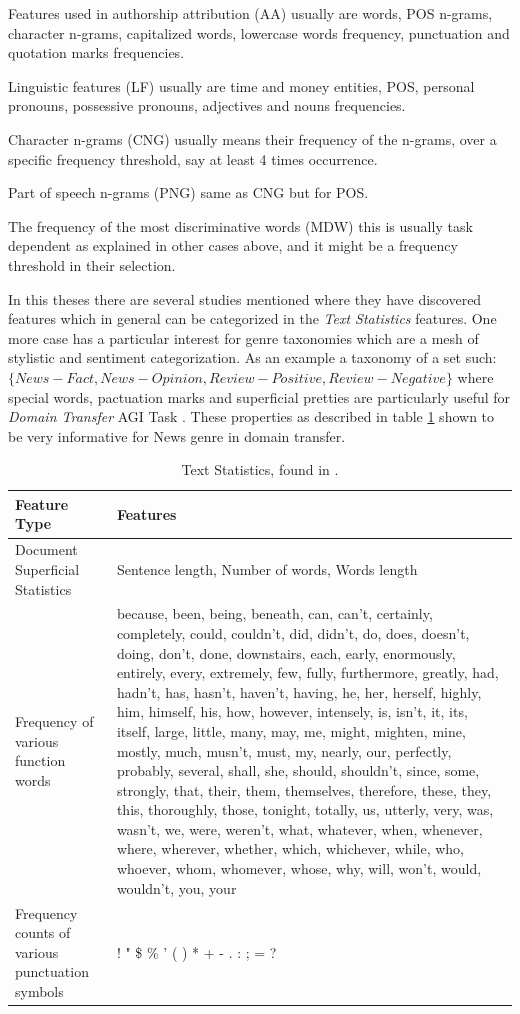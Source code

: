 Features used in authorship attribution (AA) usually are words, POS n-grams, character n-grams, capitalized words, lowercase words frequency, punctuation and quotation marks frequencies. 

Linguistic features (LF) usually are time and money entities, POS, personal pronouns, possessive pronouns, adjectives and nouns frequencies. 

Character n-grams (CNG) usually means their frequency of the n-grams, over a specific frequency threshold, say at least 4 times occurrence. 

Part of speech n-grams (PNG) same as CNG but for POS.

The frequency of the most discriminative words (MDW) this is usually task dependent as explained in other cases above, and it might be a frequency threshold in their selection. 

In this theses there are several studies mentioned where they have discovered features which in general can be categorized in the \textit{Text Statistics} features. One more case has a particular interest for genre taxonomies which are a mesh of stylistic and sentiment categorization. As an example a taxonomy of a set such: $\{News-Fact, News-Opinion, Review-Positive, Review-Negative\}$ where special words, pactuation marks and superficial pretties are particularly useful for \textit{Domain Transfer} AGI Task \parencite{finn2006learning}. These properties as described in table \ref{chap:relevant_work:tbl:domain_trans_text_statistics} shown to be very informative for News genre in domain transfer.

\begin{table}[t]
	\center
	\caption {Text Statistics, found in \parencite{finn2006learning}.}\label{chap:relevant_work:tbl:domain_trans_text_statistics}
	\begin{tabular}{p{3cm}|p{11cm}}
		\hline
		Feature Type & Features\\
		\hline
		 Document Superficial Statistics & Sentence length, Number of words, Words length \\
         Frequency of various function words & because, been, being, beneath, can, can’t, certainly, completely, could, couldn’t, did, didn’t, do, does, doesn’t, doing, don’t, done, downstairs, each, early, enormously, entirely, every, extremely, few, fully, furthermore, greatly, had, hadn’t, has, hasn’t, haven’t, having, he, her, herself, highly, him, himself, his, how, however, intensely, is, isn’t, it, its, itself, large, little, many, may, me, might, mighten, mine, mostly, much, musn’t, must, my, nearly, our, perfectly, probably, several, shall, she, should, shouldn’t, since, some, strongly, that, their, them, themselves, therefore, these, they, this, thoroughly, those, tonight, totally, us, utterly, very, was, wasn’t, we, were, weren’t, what, whatever, when, whenever, where, wherever, whether, which, whichever, while, who, whoever, whom, whomever, whose, why, will, won’t, would, wouldn’t, you, your \\
         Frequency counts of various punctuation symbols  & ! " \$ \% ' ( ) * + - . : ; = ? \\
  		\hline
	\end{tabular}
\end{table}

